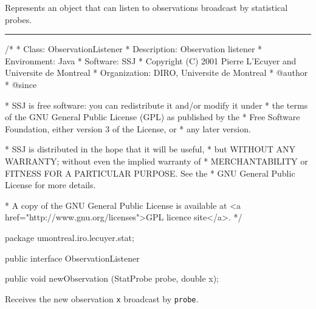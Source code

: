 
Represents an object that can listen to observations broadcast
by statistical probes.

\bigskip\hrule

\begin{code}
\begin{hide}
/*
 * Class:        ObservationListener
 * Description:  Observation listener
 * Environment:  Java
 * Software:     SSJ 
 * Copyright (C) 2001  Pierre L'Ecuyer and Universite de Montreal
 * Organization: DIRO, Universite de Montreal
 * @author       
 * @since

 * SSJ is free software: you can redistribute it and/or modify it under
 * the terms of the GNU General Public License (GPL) as published by the
 * Free Software Foundation, either version 3 of the License, or
 * any later version.

 * SSJ is distributed in the hope that it will be useful,
 * but WITHOUT ANY WARRANTY; without even the implied warranty of
 * MERCHANTABILITY or FITNESS FOR A PARTICULAR PURPOSE.  See the
 * GNU General Public License for more details.

 * A copy of the GNU General Public License is available at
   <a href="http://www.gnu.org/licenses">GPL licence site</a>.
 */
\end{hide}
package umontreal.iro.lecuyer.stat;


public interface ObservationListener\begin{hide} {\end{hide}

   public void newObservation (StatProbe probe, double x);
\end{code}
\begin{tabb} Receives the new observation \texttt{x} broadcast by \texttt{probe}.
\end{tabb}
\begin{htmlonly}
\end{htmlonly}
\begin{code}\begin{hide}
}\end{hide}
\end{code}
